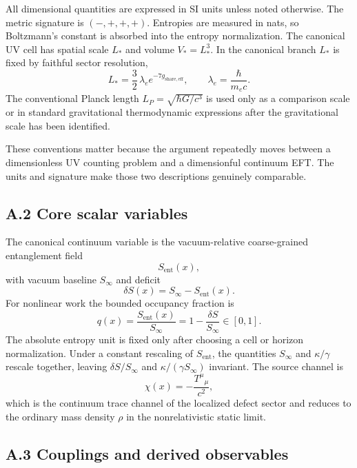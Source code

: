 \documentclass[11pt]{article}
\begin{document}
All dimensional quantities are expressed in SI units unless noted otherwise. The metric signature is $(-,+,+,+)$. Entropies are measured in nats, so Boltzmann's constant is absorbed into the entropy normalization. The canonical UV cell has spatial scale $L_*$ and volume $V_*=L_*^3$. In the canonical branch $L_*$ is fixed by faithful sector resolution,
\[
L_*=\frac32\,\lambda_e e^{-7g_{\mathrm{share,eff}}},
\qquad
\lambda_e=\frac{\hbar}{m_ec}.
\]
The conventional Planck length $L_P=\sqrt{\hbar G/c^3}$ is used only as a comparison scale or in standard gravitational thermodynamic expressions after the gravitational scale has been identified.

These conventions matter because the argument repeatedly moves between a dimensionless UV counting problem and a dimensionful continuum EFT. The units and signature make those two descriptions genuinely comparable.

\subsection*{A.2 Core scalar variables}

The canonical continuum variable is the vacuum-relative coarse-grained entanglement field
\[
S_{\mathrm{ent}}(x),
\]
with vacuum baseline $S_\infty$ and deficit
\[
\delta S(x)=S_\infty-S_{\mathrm{ent}}(x).
\]
For nonlinear work the bounded occupancy fraction is
\[
q(x)=\frac{S_{\mathrm{ent}}(x)}{S_\infty}=1-\frac{\delta S}{S_\infty}\in[0,1].
\]
The absolute entropy unit is fixed only after choosing a cell or horizon normalization. Under a constant rescaling of $S_{\mathrm{ent}}$, the quantities $S_\infty$ and $\kappa/\gamma$ rescale together, leaving $\delta S/S_\infty$ and $\kappa/(\gamma S_\infty)$ invariant.
The source channel is
\[
\chi(x)=-\frac{T^\mu{}_\mu}{c^2},
\]
which is the continuum trace channel of the localized defect sector and reduces to the ordinary mass density $\rho$ in the nonrelativistic static limit.

\subsection*{A.3 Couplings and derived observables}
\end{document}
